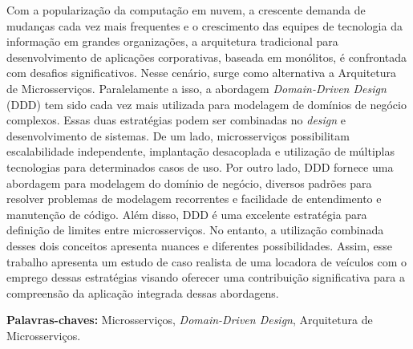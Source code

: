 \begin{resumo}



Com a popularização da computação em nuvem, a crescente demanda de mudanças cada vez mais frequentes e o crescimento das equipes de tecnologia da informação em grandes organizações, a arquitetura tradicional para desenvolvimento de aplicações corporativas, baseada em monólitos, é confrontada com desafios significativos. Nesse cenário, surge como alternativa a Arquitetura de Microsserviços. Paralelamente a isso, a abordagem \textit{Domain-Driven Design} (DDD) tem sido cada vez mais utilizada para modelagem de domínios de negócio complexos. Essas duas estratégias podem ser combinadas no \textit{design} e desenvolvimento de sistemas. De um lado, microsserviços possibilitam escalabilidade independente, implantação desacoplada e utilização de múltiplas tecnologias para determinados casos de uso. Por outro lado, DDD fornece uma abordagem para modelagem do domínio de negócio, diversos padrões para resolver problemas de modelagem recorrentes e facilidade de entendimento e manutenção de código. Além disso, DDD é uma excelente estratégia para definição de limites entre microsserviços. No entanto, a utilização combinada desses dois conceitos apresenta nuances e diferentes possibilidades. Assim, esse trabalho apresenta um estudo de caso realista de uma locadora de veículos com o emprego dessas estratégias visando oferecer uma contribuição significativa para a compreensão da aplicação integrada dessas abordagens.

\textbf{Palavras-chaves: } Microsserviços, \textit{Domain-Driven Design}, Arquitetura de Microsserviços.  

\end{resumo}


